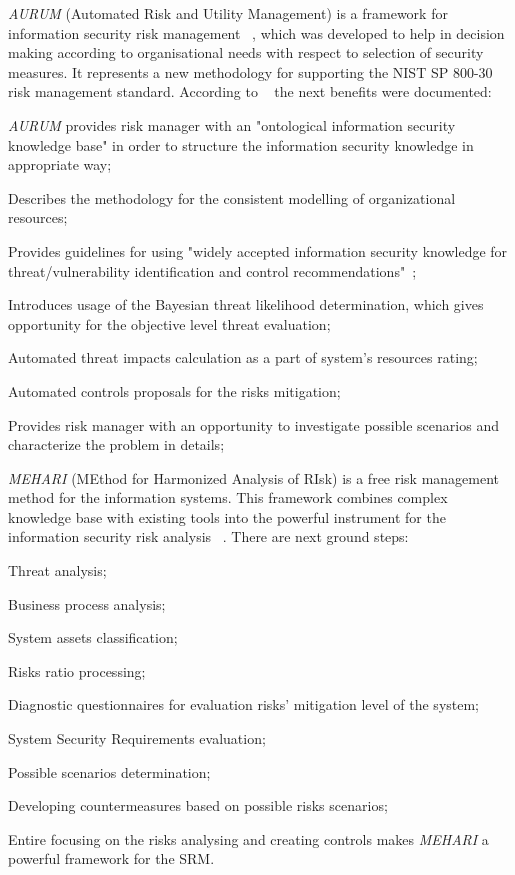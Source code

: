\documentclass[12pt]{article}
\begin{document}
\textit{AURUM} (Automated Risk and Utility Management) is a framework for information security risk management ~\cite{AURUM}, which was developed to help in decision making according to organisational needs with respect to selection of security measures. It represents a new methodology for supporting the NIST SP 800-30 risk management standard. According to ~\cite{AURUM} the next benefits were documented: 
\begin{enumerate*}[label=(\roman*)]
	\item \textit{AURUM} provides risk manager with an "ontological information security knowledge base" in order to structure the information security knowledge in appropriate way;
	\item Describes the methodology for the consistent modelling of organizational resources;
	\item Provides guidelines for using "widely accepted
information security knowledge for threat/vulnerability
identification and control recommendations"~\cite{AURUM};
	\item Introduces usage of the Bayesian threat likelihood determination, which gives opportunity for the objective level threat evaluation;
	\item Automated threat impacts calculation as a part of system's resources rating;
	\item Automated controls proposals for the risks mitigation; 
	\item Provides risk manager with an opportunity to investigate possible scenarios and characterize  the problem in details; 
\end{enumerate*} 

\textit{MEHARI} (MEthod for Harmonized Analysis of RIsk) is a free risk management method for the information systems. This framework combines complex knowledge base with existing tools into the powerful instrument for the information security risk analysis ~\cite{MEHARI}. There are next ground steps:
\begin{enumerate*}[label=(\roman*)]
	\item Threat analysis;
	\item Business process analysis;
	\item System assets classification;
	\item Risks ratio processing;
	\item Diagnostic questionnaires for evaluation risks' mitigation level of the system;
	\item System Security Requirements evaluation;
	\item Possible scenarios determination;
	\item Developing countermeasures based on possible risks scenarios;
\end{enumerate*}
Entire focusing on the risks analysing and creating controls makes \textit{MEHARI} a powerful framework for the SRM.
\end{document}
